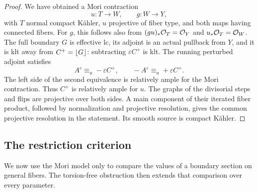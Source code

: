 \begin{proof}
We have obtained a Mori contraction
\[
 u:T\longrightarrow W,\qquad g:W\longrightarrow Y,
\]
with \(T\) normal compact K\"ahler, \(u\) projective of fiber type, and
both maps having connected fibers.  For \(g\), this follows also from
\((g u)_*\mathcal O_T=\mathcal O_Y\) and \(u_*\mathcal O_T=\mathcal O_W\).  The full boundary
\(G\) is effective lc, its adjoint is an actual pullback from \(Y\), and
it is klt away from \(C^+=\left\lfloor G\right\rfloor\): subtracting \(\varepsilon C^+\)
is klt.  The running perturbed adjoint satisfies
\[
 A^{\varepsilon}\equiv_u-\varepsilon C^+,
 \qquad -A^{\varepsilon}\equiv_u+\varepsilon C^+.
\]
The left side of the second equivalence is relatively ample for the
Mori contraction.  Thus \(C^+\) is relatively ample for \(u\).
The graphs of the divisorial steps and flips are projective over both
sides.  A main component of their iterated fiber product, followed by
normalization and projective resolution, gives the common projective
resolution in the statement.  Its smooth source is compact K\"ahler.
\end{proof}

\subsection{The restriction criterion}

We now use the Mori model only to compare the values of a boundary
section on general fibers.  The torsion-free obstruction then extends
that comparison over every parameter.

